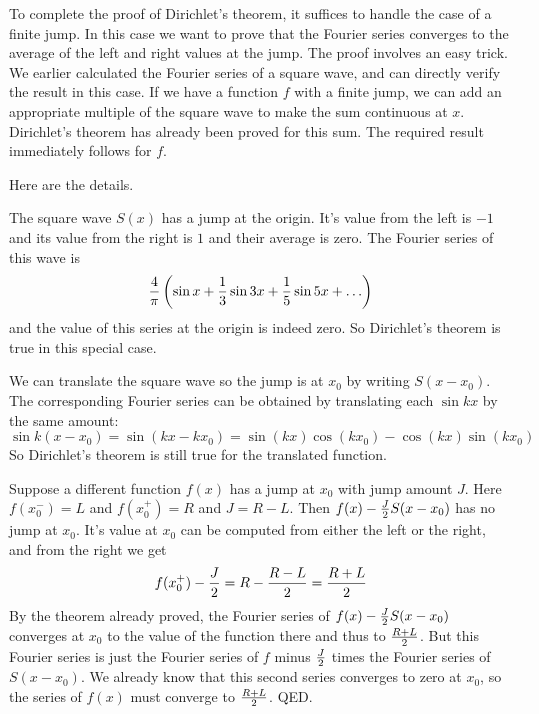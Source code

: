 \documentclass[11pt, oneside]{article}   	%
\begin{document}
To complete the proof of Dirichlet's theorem, it suffices to handle the case of a finite jump. In this case we want to prove that the Fourier series converges to the average of the left and right values at the jump. The proof involves an easy trick. We earlier calculated the Fourier series of a square wave, and can directly verify the result in this case. If we have a function $f$ with a finite jump, we can add an appropriate multiple of the square wave to make the sum continuous at $x$. Dirichlet's theorem has already been proved for this sum. The required result immediately follows for $f$.

Here are the details. 

The square wave $S(x)$ has a jump at the origin. It's value from the left is $-1$ and its value from the right is $1$ and their average is zero. The Fourier series of this wave is
\[{4 \over \pi} \left( \sin x + {1 \over 3} \sin 3x + {1 \over 5} \sin 5x + \ldots \right)\]
and the value of this series at the origin is indeed zero. So Dirichlet's theorem is true in this special case.

We can translate the square wave so the jump is at $x_0$ by writing $S(x - x_0)$. The corresponding Fourier series can be obtained by translating each $\sin kx$ by the same amount: 
\[\sin k(x - x_0) = \sin (kx - k x_0) = \sin(kx) \cos (k x_0) - \cos(kx) \sin(k x_0)\] So Dirichlet's theorem is still true for the translated function.

Suppose a different function $f(x)$ has a jump at $x_0$ with jump amount $J$. Here $f(x_0^-) = L$ and
$f(x_0^+) = R$ and $J = R - L$. Then $f(x) - {J \over 2} S(x - x_0)$ has no jump at $x_0$. It's value at $x_0$
can be computed from either the left or the right, and from the right we get \[f(x_0^+) - {J \over 2} = R - {{R - L} \over 2} = {{R + L} \over 2}\]
By the theorem already proved, the Fourier series of $f(x) - {J \over 2} S(x - x_0)$ converges at $x_0$ to the value of the function there and thus to ${{R + L} \over 2}$. But this Fourier series is just the Fourier series of $f$ minus ${J \over 2}$ times the Fourier series of $S(x - x_0)$. We already know that this second series converges to zero at $x_0$,  so the series of $f(x)$ must converge to ${{R + L} \over 2}$. QED. 
\end{document}
